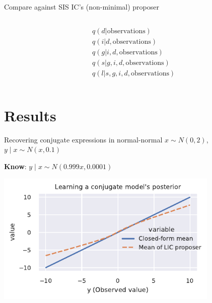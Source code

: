 \documentclass[12pt]{beamer}
\begin{document}
\begin{frame}{Compare against SIS IC's (non-minimal) proposer}
\begin{columns}
    \begin{column}{0.5\linewidth}
        \begin{align*}
            & q(d | \text{observations}) \\
            & q(i|d, \text{observations}) \\
            & q(g | i, d, \text{observations}) \\
            & q(s | g, i, d, \text{observations}) \\
            & q(l | s, g, i, d, \text{observations})
        \end{align*}
    \end{column}
\end{columns}
\end{frame}


\section{Results}

\begin{frame}{Recovering conjugate expressions in normal-normal}
    \centering
    $x \sim N(0, 2)$, $y \mid x \sim N(x, 0.1)$

    \textbf{Know}: $y \mid x \sim N(0.999x, 0.0001)$

    \includegraphics[width=0.8\textwidth]{figures/normal_normal_mean.pdf}
\end{frame}
\end{document}
